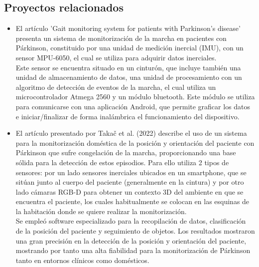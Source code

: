 \subsection{Proyectos relacionados}
\begin{itemize}
\item El artículo 'Gait monitoring system for patients with Parkinson’s disease' \cite{GONCALVES2021115653} presenta un sistema de monitorización de la marcha en pacientes con Párkinson, constituido por una unidad de medición inercial (IMU), con un sensor MPU-6050, el cual se utiliza para adquirir datos inerciales.\\

Este sensor se encuentra situado en un cinturón, que incluye también una unidad de almacenamiento de datos, una unidad de procesamiento con un algoritmo de detección de eventos de la marcha, el cual utiliza un microcontrolador Atmega 2560 y un módulo bluetooth. Este módulo se utiliza para comunicarse con una aplicación Android, que permite graficar los datos e iniciar/finalizar de forma inalámbrica el funcionamiento del dispositivo.
\item El artículo presentado por Takač et al. (2022)\cite{info:doi/10.2196/mhealth.2539} describe el uso de un sistema para la monitorización doméstica de la posición y orientación del paciente con Párkinson que sufre congelación de la marcha, proporcionando una base sólida para la detección de estos episodios. Para ello utiliza 2 tipos de sensores: por un lado sensores inerciales ubicados en un smartphone, que se sitúan junto al cuerpo del paciente (generalmente en la cintura) y por otro lado cámaras RGB-D para obtener un contexto 3D del ambiente en que se encuentra el paciente, los cuales habitualmente se colocan en las esquinas de la habitación donde se quiere realizar la monitorización. \\
Se empleó software especializado para la recopilación de datos, clasificación de la posición del paciente y seguimiento de objetos. Los resultados mostraron una gran precisión en la detección de la posición y orientación del paciente, mostrando por tanto una alta fiabilidad para la monitorización de Párkinson tanto en entornos clínicos como domésticos.

\end{itemize}